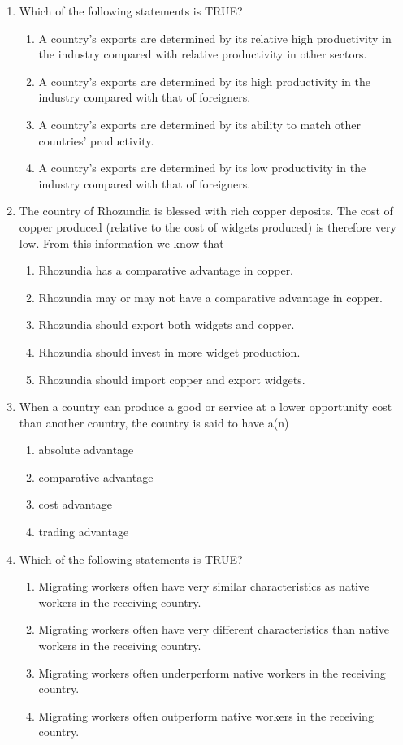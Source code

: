 \documentclass[12pt]{article}
\begin{document}
\begin{enumerate}[label=\textbf{\arabic*.}]
\item Which of the following statements is TRUE?
\begin{enumerate}[label=\Alph*.]
\item A country's exports are determined by its relative high productivity in the industry compared with relative productivity in other sectors.
\item A country's exports are determined by its high productivity in the industry compared with that of foreigners.
\item A country's exports are determined by its ability to match other countries' productivity.
\item A country's exports are determined by its low productivity in the industry compared with that of foreigners.
\end{enumerate}

\newpage
\item The country of Rhozundia is blessed with rich copper deposits. The cost of copper produced (relative to the cost of widgets produced) is therefore very low. From this information we know that
\begin{enumerate}[label=\Alph*.]
\item Rhozundia has a comparative advantage in copper.
\item Rhozundia may or may not have a comparative advantage in copper.
\item Rhozundia should export both widgets and copper.
\item Rhozundia should invest in more widget production.
\item Rhozundia should import copper and export widgets.
\end{enumerate}

\item When a country can produce a good or service at a lower opportunity cost than another country, the country is said to have a(n)
\begin{enumerate}[label=\Alph*.]
\item absolute advantage
\item comparative advantage
\item cost advantage
\item trading advantage
\end{enumerate}

\item Which of the following statements is TRUE?
\begin{enumerate}[label=\Alph*.]
\item Migrating workers often have very similar characteristics as native workers in the receiving country.
\item Migrating workers often have very different characteristics than native workers in the receiving country.
\item Migrating workers often underperform native workers in the receiving country.
\item Migrating workers often outperform native workers in the receiving country.
\end{enumerate}


\end{enumerate}
\end{document}
